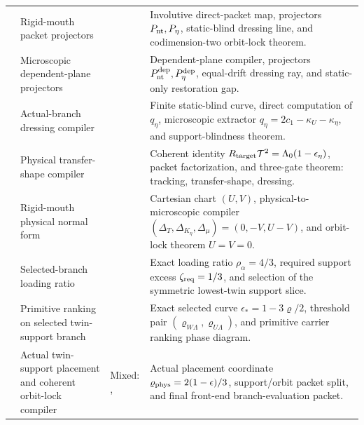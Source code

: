 \begin{longtable}{@{}L{0.075\textwidth}L{0.34\textwidth}L{0.20\textwidth}L{0.33\textwidth}@{}}
 & Rigid-mouth packet projectors & \StatusExactClosure{} & Involutive direct-packet map, projectors \(P_{\rm nt},P_\eta\), static-blind dressing line, and codimension-two orbit-lock theorem. \\
 & Microscopic dependent-plane projectors & \StatusExactClosure{} & Dependent-plane compiler, projectors \(P_{\rm nt}^{\rm dep},P_\eta^{\rm dep}\), equal-drift dressing ray, and static-only restoration gap. \\
 & Actual-branch dressing compiler & \StatusExactClosure{} & Finite static-blind curve, direct computation of \(q_\eta\), microscopic extractor \(q_\eta=2c_1-\kappa_U-\kappa_\eta\), and support-blindness theorem. \\
 & Physical transfer-shape compiler & \StatusExactClosure{} & Coherent identity \(R_{\rm target}\mathcal T^2=\Lambda_0(1-\epsilon_\eta)\), packet factorization, and three-gate theorem: tracking, transfer-shape, dressing. \\
 & Rigid-mouth physical normal form & \StatusExactClosure{} & Cartesian chart \((U,V)\), physical-to-microscopic compiler \((\Delta_T,\Delta_{K_\eta},\Delta_\mu)=(0,-V,U-V)\), and orbit-lock theorem \(U=V=0\). \\
 & Selected-branch loading ratio & \StatusExactClosure{} & Exact loading ratio \(\rho_\alpha=4/3\), required support excess \(\zeta_{\rm req}=1/3\), and selection of the symmetric lowest-twin support slice. \\
 & Primitive ranking on selected twin-support branch & \StatusExactClosure{} & Exact selected curve \(\epsilon_*=1-3\varrho/2\), threshold pair \((\varrho_{W\Lambda},\varrho_{U\Lambda})\), and primitive carrier ranking phase diagram. \\
 & Actual twin-support placement and coherent orbit-lock compiler & Mixed: \StatusExactClosure{}, \StatusOpen{} & Actual placement coordinate \(\varrho_{\rm phys}=2(1-\epsilon)/3\), support/orbit packet split, and final front-end branch-evaluation packet. \\
\bottomrule
\end{longtable}


